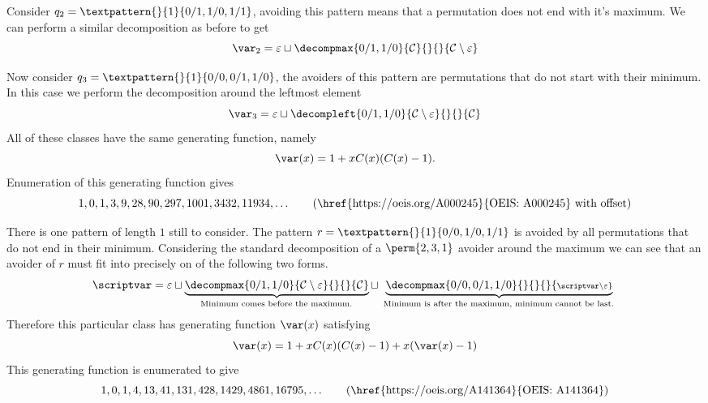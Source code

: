 Consider \(q_2 = \textpattern{}{1}{0/1,1/0,1/1}\), avoiding this pattern
means that a permutation does not end with it's maximum. We can perform a similar
decomposition as before to get
\begin{equation*}
    \mathcal{\var}_2 =\varepsilon \sqcup \decompmax{0/1,1/0}{\mathcal{C}}{}{}{\mathcal{C}\setminus\varepsilon}
\end{equation*}

Now consider \(q_3 = \textpattern{}{1}{0/0,0/1,1/0}\), the avoiders of this
pattern are permutations that do not start with their minimum. In this case we
perform the decomposition around the leftmost element
\begin{equation*}
    \mathcal{\var}_3 =\varepsilon \sqcup \decompleft{0/1,1/0}{\mathcal{C}\setminus\varepsilon}{}{}{\mathcal{C}}
\end{equation*}
All of these classes have the same generating function, namely
\begin{equation*}
    \var(x) = 1 + xC(x)(C(x)-1).
\end{equation*}
Enumeration of this generating function gives
\begin{equation*}
    1, 0, 1, 3, 9, 28, 90, 297, 1001, 3432, 11934,\dotsc \tag{\href{https://oeis.org/A000245}{OEIS: A000245} with offset}
\end{equation*}

\nextvar[\varmaxl]
There is one pattern of length \(1\) still to consider. The pattern
\(r = \textpattern{}{1}{0/0,1/0,1/1}\) is avoided by all permutations
that do not end in their minimum. Considering the standard decomposition
of a \(\perm{2,3,1}\) avoider around the maximum we can see that an avoider
of \(r\) must fit into precisely on of the following two forms.
\begin{equation*}
    \scriptvar = \varepsilon \sqcup
    \underbrace{\decompmax{0/1,1/0}{\mathcal{C}\setminus\varepsilon}{}{}{\mathcal{C}}}_\text{
        Minimum comes before the maximum.
    } \sqcup
    \underbrace{\decompmax{0/0,0/1,1/0}{}{}{}{\scriptstyle{\scriptvar\setminus\varepsilon}}}_\text{
        Minimum is after the maximum, minimum cannot be last.
    }
\end{equation*}
Therefore this particular class has generating function \(\var(x)\) satisfying
\begin{equation*}
    \var(x) = 1 + xC(x)(C(x)-1) + x(\var(x)-1)
\end{equation*}
This generating function is enumerated to give
\begin{equation*}
    	1, 0, 1, 4, 13, 41, 131, 428, 1429, 4861, 16795,\dotsc \tag{\href{https://oeis.org/A141364}{OEIS: A141364}}
\end{equation*}

